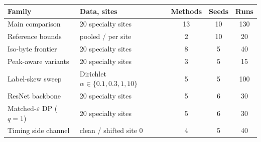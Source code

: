 \begin{tabular}{@{}llccc@{}}
\toprule
Family & Data, sites & Methods & Seeds & Runs\\
\midrule
Main comparison & 20 specialty sites & 13 & 10 & 130\\
Reference bounds & pooled / per site & 2 & 10 & 20\\
Iso-byte frontier & 20 specialty sites & 8 & 5 & 40\\
Peak-aware variants & 20 specialty sites & 3 & 5 & 15\\
Label-skew sweep & Dirichlet $\alpha\in\{0.1,0.3,1,10\}$ & 5 & 5 & 100\\
ResNet backbone & 20 specialty sites & 5 & 6 & 30\\
Matched-$\varepsilon$ DP ($q=1$) & 20 specialty sites & 5 & 6 & 30\\
Timing side channel & clean / shifted site 0 & 4 & 5 & 40\\
\bottomrule
\end{tabular}
